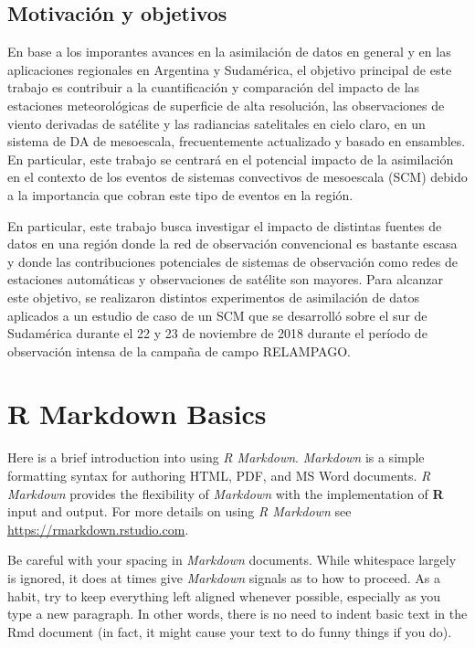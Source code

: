 \documentclass[12pt,twoside]{reedthesis}
\begin{document}
\hypertarget{motivaciuxf3n-y-objetivos}{%
\section{Motivación y objetivos}\label{motivaciuxf3n-y-objetivos}}

En base a los imporantes avances en la asimilación de datos en general y en las aplicaciones regionales en Argentina y Sudamérica, el objetivo principal de este trabajo es contribuir a la cuantificación y comparación del impacto de las estaciones meteorológicas de superficie de alta resolución, las observaciones de viento derivadas de satélite y las radiancias satelitales en cielo claro, en un sistema de DA de mesoescala, frecuentemente actualizado y basado en ensambles. En particular, este trabajo se centrará en el potencial impacto de la asimilación en el contexto de los eventos de sistemas convectivos de mesoescala (SCM) debido a la importancia que cobran este tipo de eventos en la región.

En particular, este trabajo busca investigar el impacto de distintas fuentes de datos en una región donde la red de observación convencional es bastante escasa y donde las contribuciones potenciales de sistemas de observación como redes de estaciones automáticas y observaciones de satélite son mayores. Para alcanzar este objetivo, se realizaron distintos experimentos de asimilación de datos aplicados a un estudio de caso de un SCM que se desarrolló sobre el sur de Sudamérica durante el 22 y 23 de noviembre de 2018 durante el período de observación intensa de la campaña de campo RELAMPAGO.

\hypertarget{rmd-basics}{%
\chapter{R Markdown Basics}\label{rmd-basics}}

Here is a brief introduction into using \emph{R Markdown}. \emph{Markdown} is a simple formatting syntax for authoring HTML, PDF, and MS Word documents. \emph{R Markdown} provides the flexibility of \emph{Markdown} with the implementation of \textbf{R} input and output. For more details on using \emph{R Markdown} see \url{https://rmarkdown.rstudio.com}.

Be careful with your spacing in \emph{Markdown} documents. While whitespace largely is ignored, it does at times give \emph{Markdown} signals as to how to proceed. As a habit, try to keep everything left aligned whenever possible, especially as you type a new paragraph. In other words, there is no need to indent basic text in the Rmd document (in fact, it might cause your text to do funny things if you do).
\end{document}
